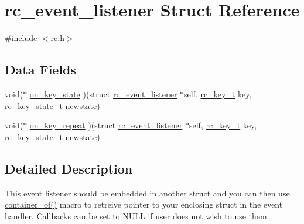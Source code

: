 \hypertarget{structrc__event__listener}{\section{rc\+\_\+event\+\_\+listener Struct Reference}
\label{structrc__event__listener}
}


{\ttfamily \#include $<$rc.\+h$>$}

\subsection*{Data Fields}
\begin{DoxyCompactItemize}
\item 
void($\ast$ \hyperlink{structrc__event__listener_a636281a638798459ca151e7087c9ab46}{on\+\_\+key\+\_\+state} )(struct \hyperlink{structrc__event__listener}{rc\+\_\+event\+\_\+listener} $\ast$self, \hyperlink{rc_8h_ae3f7a6474966dabf22159d8d834fa84b}{rc\+\_\+key\+\_\+t} key, \hyperlink{rc_8h_a725b08f81942c36aa9c4b7041a3d6871}{rc\+\_\+key\+\_\+state\+\_\+t} newstate)
\item 
void($\ast$ \hyperlink{structrc__event__listener_aaa9b375dd7f5d56f981e351c5e657876}{on\+\_\+key\+\_\+repeat} )(struct \hyperlink{structrc__event__listener}{rc\+\_\+event\+\_\+listener} $\ast$self, \hyperlink{rc_8h_ae3f7a6474966dabf22159d8d834fa84b}{rc\+\_\+key\+\_\+t} key, \hyperlink{rc_8h_a725b08f81942c36aa9c4b7041a3d6871}{rc\+\_\+key\+\_\+state\+\_\+t} newstate)
\end{DoxyCompactItemize}


\subsection{Detailed Description}
This event listener should be embedded in another struct and you can then use \hyperlink{utils_8h_af8c317a42292b61c93aae91e59118a46}{container\+\_\+of()} macro to retreive pointer to your enclosing struct in the event handler. Callbacks can be set to N\+U\+L\+L if user does not wish to use them. 

